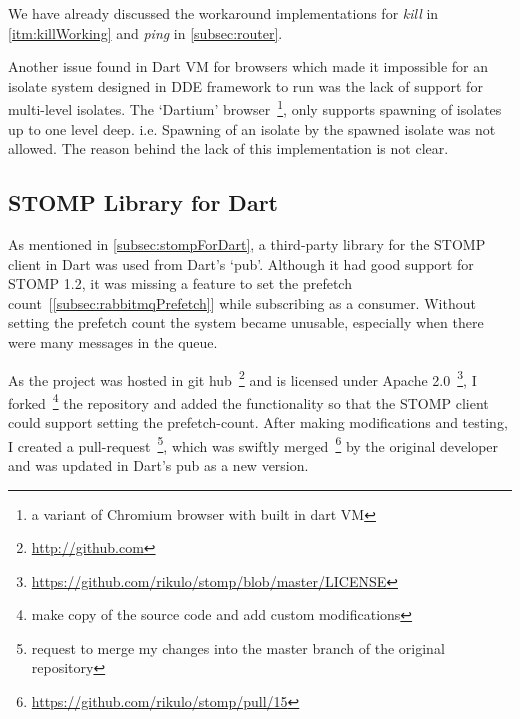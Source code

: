   We have already discussed the workaround implementations for \emph{kill} in \autoref{itm:killWorking} and \emph{ping} in \autoref{subsec:router}.

  Another issue found in Dart VM for browsers which made it impossible for an isolate system designed in DDE framework to run was the lack of support for multi-level isolates. The ‘Dartium’ browser~\footnote{a variant of Chromium browser with built in dart VM}, only supports spawning of isolates up to one level deep. i.e. Spawning of an isolate by the spawned isolate was not allowed. The reason behind the lack of this implementation is not clear.

\subsection{STOMP Library for Dart}
  As mentioned in \autoref{subsec:stompForDart}, a third-party library for the STOMP client in Dart was used from Dart's ‘pub’. Although it had good support for STOMP 1.2, it was missing a feature to set the prefetch count~[\autoref{subsec:rabbitmqPrefetch}] while subscribing as a consumer. Without setting the prefetch count the system became unusable, especially when there were many messages in the queue.

  As the project was hosted in git hub~\footnote{\url{http://github.com}} and is licensed under Apache 2.0~\footnote{\url{https://github.com/rikulo/stomp/blob/master/LICENSE}}, I forked~\footnote{make copy of the source code and add custom modifications} the repository and added the functionality so that the STOMP client could support setting the prefetch-count. After making modifications and testing, I created a pull-request~\footnote{request to merge my changes into the master branch of the original repository}, which was swiftly merged~\footnote{\url{https://github.com/rikulo/stomp/pull/15}} by the original developer and was updated in Dart's pub as a new version.
